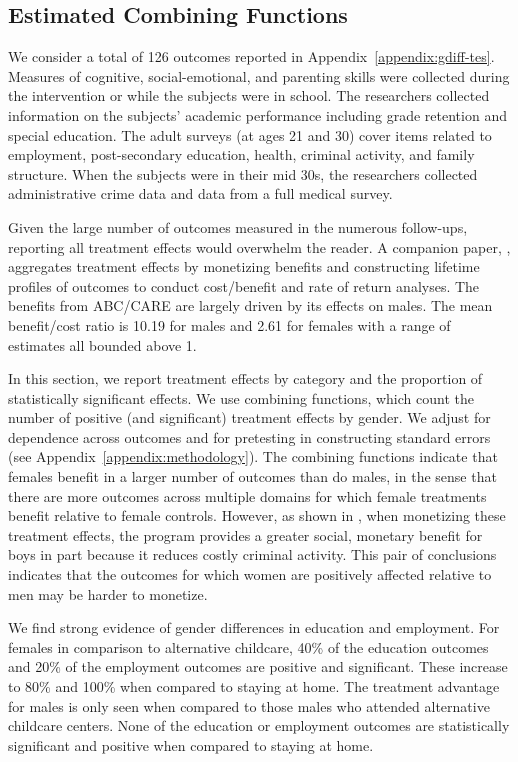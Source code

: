 \subsection{Estimated Combining Functions}

We consider a total of 126 outcomes reported in Appendix~\ref{appendix:gdiff-tes}. Measures of cognitive, social-emotional, and parenting skills were collected during the intervention or while the subjects were in school. The researchers collected information on the subjects' academic performance including grade retention and special education. The adult surveys (at ages 21 and 30) cover items related to employment, post-secondary education, health, criminal activity, and family structure. When the subjects were in their mid 30s, the researchers collected administrative crime data and data from a full medical survey.

Given the large number of outcomes measured in the numerous follow-ups, reporting all treatment effects would overwhelm the reader. A companion paper, \citet{Garcia_Heckman_Leaf_etal_2017_Comp_CBA_Unpublished}, aggregates treatment effects by monetizing benefits and constructing lifetime profiles of outcomes to conduct cost/benefit and rate of return analyses. The benefits from ABC/CARE are largely driven by its effects on males. The mean benefit/cost ratio is 10.19 for males and 2.61 for females with a range of estimates all bounded above 1.

In this section, we report treatment effects by category and the proportion of statistically significant effects. We use combining functions, which count the number of positive (and significant) treatment effects by gender. We adjust for dependence across outcomes and for pretesting in constructing standard errors (see Appendix~\ref{appendix:methodology}). The combining functions indicate that females benefit in a larger number of outcomes   than do males, in the sense that there are more outcomes across multiple domains for which female treatments benefit relative to female controls. However, as shown in \cite{Garcia_Heckman_Leaf_etal_2017_Comp_CBA_Unpublished}, when monetizing these treatment effects, the program provides a greater social, monetary benefit for boys in part because it reduces costly criminal activity. This pair of conclusions indicates that the outcomes for which women are positively affected relative to men may be harder to monetize.  

We find strong evidence of gender differences in education and employment. For females in comparison to alternative childcare, 40\% of the education outcomes and 20\% of the employment outcomes are positive and significant. These increase to 80\% and 100\% when compared to staying at home. The treatment advantage for males is only seen when compared to those males who attended alternative childcare centers. None of the education or employment outcomes are statistically significant and positive when compared to staying at home.

